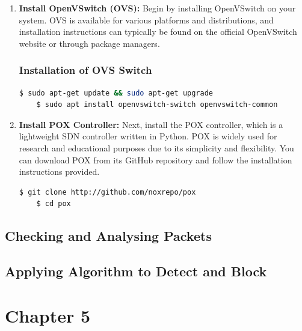 \documentclass[12pt,letterpaper]{article}
\begin{document}
        \begin{enumerate}
        
            \item \textbf{Install OpenVSwitch (OVS):} Begin by installing OpenVSwitch on your system. OVS is available for various platforms and distributions, and installation instructions can typically be found on the official OpenVSwitch website or through package managers.

            \subsubsection{Installation of OVS Switch}

\begin{lstlisting}[language=bash]
    $ sudo apt-get update && sudo apt-get upgrade 
    $ sudo apt install openvswitch-switch openvswitch-common
\end{lstlisting}

            \item \textbf{Install POX Controller:} Next, install the POX controller, which is a lightweight SDN controller written in Python. POX is widely used for research and educational purposes due to its simplicity and flexibility. You can download POX from its GitHub repository and follow the installation instructions provided.

\begin{lstlisting}[language=bash]
    $ git clone http://github.com/noxrepo/pox
    $ cd pox
\end{lstlisting}            

            
        \end{enumerate}

        

        \subsection{Checking and Analysing Packets}
            \label{Checking and Analysing Packets}




            
        \subsection{Applying Algorithm to Detect and Block}
            \label{Applying Algorithm to Detect and Block}
        
\clearpage
    \newpage
    \section*{Chapter 5}
\end{document}
